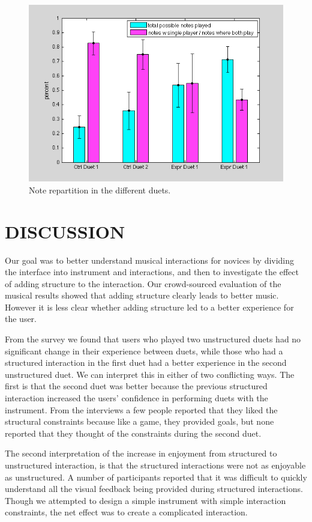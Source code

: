 \documentclass{article}
\begin{document}
\begin{figure}[tb]
\includegraphics[width=\columnwidth]{note-stats.png}
\caption{Note repartition in the different duets.} 
\label{note-stats}
\end{figure}




\section{DISCUSSION}

Our goal was to better understand musical interactions for novices by dividing the interface into instrument and interactions, and then to investigate the effect of adding structure to the interaction.  Our crowd-sourced evaluation of the musical results showed that adding structure clearly leads to better music.  However it is less clear whether adding structure led to a better experience for the user.  

From the survey we found that users who played two unstructured duets had no significant change in their experience between duets, while those who had a structured interaction in the first duet had a better experience in the second unstructured duet. We can interpret this in either of two conflicting ways.  The first is that the second duet was better because the previous structured interaction increased the users’ confidence in performing duets with the instrument. From the interviews a few people reported that they liked the structural constraints because like a game, they provided goals, but none reported that they thought of the constraints during the second duet.

The second interpretation of the increase in enjoyment from structured to unstructured interaction, is that the structured interactions were not as enjoyable as unstructured.  A number of participants reported that it was difficult to quickly understand all the visual feedback being provided during structured interactions.  Though we attempted to design a simple instrument with simple interaction constraints, the net effect was to create a complicated interaction.
\end{document}
